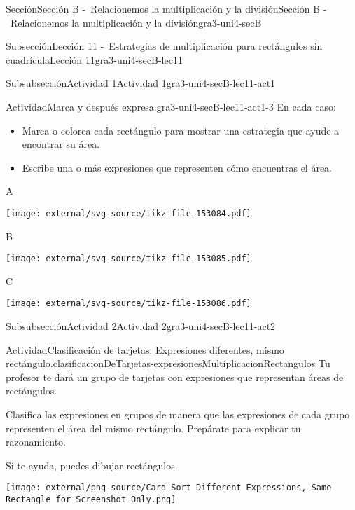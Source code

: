 \documentclass[twoside,14pt,]{extarticle}
\begin{document}
\begin{sectionptx}{Sección}{Sección B -~Relacionemos la multiplicación y la división}{}{Sección B -~Relacionemos la multiplicación y la división}{}{}{gra3-uni4-secB}
\begin{subsectionptx}{Subsección}{Lección 11 -~Estrategias de multiplicación para rectángulos sin cuadrícula}{}{Lección 11}{}{}{gra3-uni4-secB-lec11}
\begin{subsubsectionptx}{Subsubsección}{Actividad 1}{}{Actividad 1}{}{}{gra3-uni4-secB-lec11-act1}
\begin{activity}{Actividad}{Marca y después expresa.}{gra3-uni4-secB-lec11-act1-3}%
En cada caso:%
%
\begin{itemize}[label=\textbullet]
\item{}Marca o colorea cada rectángulo para mostrar una estrategia que ayude a encontrar su área.%
\item{}Escribe una o más expresiones que representen cómo encuentras el área.%
\end{itemize}
\begin{sidebyside}{3}{0}{0}{0}%
\begin{sbspanel}{0.391}%
A%
\par
\texttt{[image: external/svg-source/tikz-file-153084.pdf]}
\end{sbspanel}%
\begin{sbspanel}{0.261}%
B%
\par
\texttt{[image: external/svg-source/tikz-file-153085.pdf]}
\end{sbspanel}%
\begin{sbspanel}{0.348}%
C%
\par
\texttt{[image: external/svg-source/tikz-file-153086.pdf]}
\end{sbspanel}%
\end{sidebyside}%
\end{activity}%
\end{subsubsectionptx}
%
%
\typeout{************************************************}
\typeout{************************************************}
%
\begin{subsubsectionptx}{Subsubsección}{Actividad 2}{}{Actividad 2}{}{}{gra3-uni4-secB-lec11-act2}
\begin{activity}{Actividad}{Clasificación de tarjetas: Expresiones diferentes, mismo rectángulo.}{clasificacionDeTarjetas-expresionesMultiplicacionRectangulos}%
Tu profesor te dará un grupo de tarjetas con expresiones que representan áreas de rectángulos.%
\par
Clasifica las expresiones en grupos de manera que las expresiones de cada grupo representen el área del mismo rectángulo. Prepárate para explicar tu razonamiento.%
\par
Si te ayuda, puedes dibujar rectángulos.%
\begin{image}{0}{1}{0}{}%
\texttt{[image: external/png-source/Card Sort Different Expressions, Same Rectangle for Screenshot Only.png]}

\end{image}
\end{activity}
\end{subsubsectionptx}
\end{subsectionptx}
\end{sectionptx}
\end{document}

